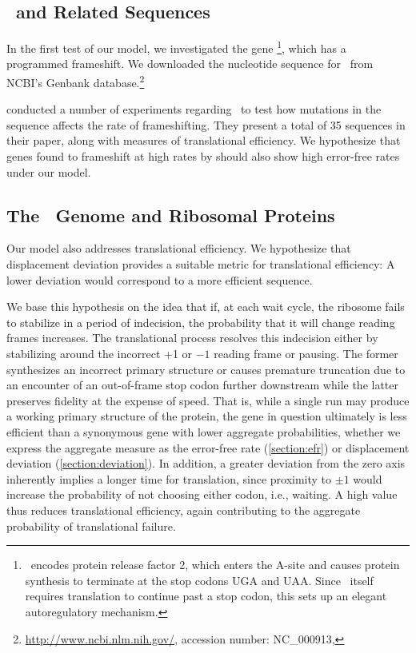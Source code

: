 \documentclass[12pt]{article}
\begin{document}
\subsection{\prfB\ and Related Sequences}
In the first test of our model, we investigated the gene
\prfB\footnote{\prfB\ encodes protein release factor 2, which enters
  the A-site and causes protein synthesis to terminate at the stop
  codons \textsc{UGA} and \textsc{UAA}. Since \prfB\ itself requires 
  translation to continue past a stop codon, this sets up an elegant 
  autoregulatory mechanism.}, which has a programmed frameshift.
We downloaded the nucleotide sequence for \prfB\ from
NCBI's Genbank database.\footnote{\url{http://www.ncbi.nlm.nih.gov/},
  accession number: NC\_000913, \prfB}

\citet{weiss87} conducted a number of experiments regarding
\prfB\ to test how mutations in the sequence affects the rate of
frameshifting.  They present a total of 35 sequences in their paper,
along with measures of translational efficiency.  We hypothesize that
genes found to frameshift at high rates by
\citeauthor{weiss87} should also show high error-free rates under
our model.

\subsection{The \ecoli\ Genome and Ribosomal Proteins}
Our model also addresses
translational efficiency. We hypothesize that displacement deviation
provides a suitable metric for translational efficiency: A lower
deviation would correspond to a more efficient sequence.

We base this hypothesis on the idea that if, at each wait cycle, the
ribosome fails to stabilize in a period of indecision, the probability
that it will change reading frames increases. The translational
process resolves this indecision either by stabilizing around the
incorrect +1 or $-1$ reading frame or pausing. The former synthesizes an
incorrect primary structure or causes premature truncation due to an encounter of an
out-of-frame stop codon further downstream while the latter preserves fidelity at the
expense of speed. That is, while a single run may produce
a working primary structure of the protein, the gene in question
ultimately is less efficient than a synonymous gene with lower
aggregate probabilities, whether we express the aggregate measure as the
error-free rate (\autoref{section:efr}) or displacement deviation
(\autoref{section:deviation}). In addition, a greater deviation from
the zero axis inherently implies a longer time for translation, 
since proximity to $\pm1$ would increase the probability of not choosing
either codon, i.e., waiting. A high value thus reduces translational
efficiency, again contributing to the aggregate probability of
translational failure.
\end{document}
